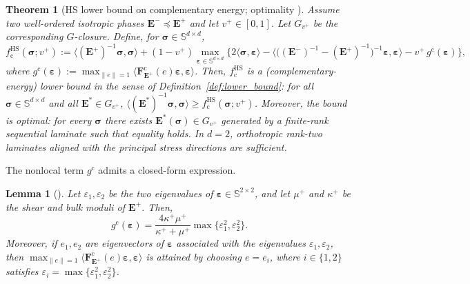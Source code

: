 \documentclass[preprint,3p]{elsarticle}
\newcommand{\tens}[1]{\bm{\mathit{#1}}}             %
\newcommand{\tenss}[1]{\bm{\mathbf{#1}}}            %
\newcommand{\tensf}[1]{\bm{\mathbf{#1}}}            %
\newcommand{\strain}{\tenss{\varepsilon}}           %
\newcommand{\stress}{\tenss{\sigma}}                %
\newcommand{\Emin}{\tensf{E}^{-}}                   %
\newcommand{\Emax}{\tensf{E}^{+}}                   %
\newcommand{\Estar}{\tensf{E}^{*}}
\newtheorem{theorem}{Theorem}[section]
\newtheorem{lemma}{Lemma}[section]
\begin{document}
\begin{theorem}[HS lower bound on complementary energy; optimality
{\citep[Proposition~2.3.25]{Allaire2002}}]
Assume two well-ordered isotropic phases $\Emin\preceq\Emax$ and let $v^+\in[0,1]$. Let $G_{v^+}$ be the corresponding $G$-closure. Define, for $\stress\in\mathbb{S}^{d\times d}$,
%
\begin{equation}\label{eq:hs_lower_bound}
f_{\mathrm{c}}^{\mathrm{HS}}(\stress;v^+)
:= \langle (\Emax)^{-1}\stress,\stress\rangle
 + (1-v^+)\max_{\strain\in\mathbb{S}^{d\times d}}
\Big\{ 2\langle\stress,\strain\rangle
 - \big\langle\big((\Emin)^{-1}-(\Emax)^{-1}\big)^{-1}\strain,\strain\big\rangle
 - v^+\, g^{\mathrm{c}}(\strain)\Big\},
\end{equation}
%
where $g^{\mathrm{c}}(\strain):=\max_{\lVert\tens{e}\rVert=1}\langle \tensf{F}^{\mathrm{c}}_{\Emax}(\tens{e})\strain,\strain\rangle$. Then, $f_{\mathrm{c}}^{\mathrm{HS}}$ is a (complementary-energy) lower bound in the sense of Definition~\ref{def:lower_bound}: for all $\stress\in\mathbb{S}^{d\times d}$ and all $\Estar\in G_{v^+}$, $\langle (\Estar)^{-1}\stress,\stress\rangle \ge f_{\mathrm{c}}^{\mathrm{HS}}(\stress;v^+)$. Moreover, the bound is optimal: for every $\stress$ there exists $\Estar(\stress)\in G_{v^+}$ generated by a finite-rank sequential laminate such that equality holds. In $d=2$, orthotropic rank-two laminates aligned with the principal stress directions are sufficient.
\end{theorem}

The nonlocal term $g^\mathrm{c}$ admits a closed-form expression.
%
\begin{lemma}[{\citep[Eq. (4.15)]{Allaire1993od}}]
    Let $\varepsilon_1,\varepsilon_2$ be the two eigenvalues of $\strain\in\mathbb{S}^{2\times 2}$, and let $\mu^+$ and $\kappa^+$ be the shear and bulk moduli of $\tensf{E}^+$. Then,
	    \begin{equation}
	        g^\mathrm{c}(\strain)=\frac{4\kappa^+\mu^+}{\kappa^++\mu^+}\max\{\varepsilon_1^2,\varepsilon_2^2\}.
	        \label{eq:gc_2d}
	    \end{equation}
    Moreover, if $\tens{e}_1,\tens{e}_2$ are eigenvectors of $\strain$ associated with the eigenvalues $\varepsilon_1,\varepsilon_2$, then $\max_{\lVert\tens{e}\rVert = 1}\langle \tensf{F}_{\Emax}^\mathrm{c}(\tens{e})\strain,\strain\rangle$ is attained by choosing $\tens{e} = \tens{e}_i$, where $i \in \{1,2\}$ satisfies $\varepsilon_i=\max\{\varepsilon_1^2,\varepsilon_2^2\}$.
\end{lemma}
\end{document}
